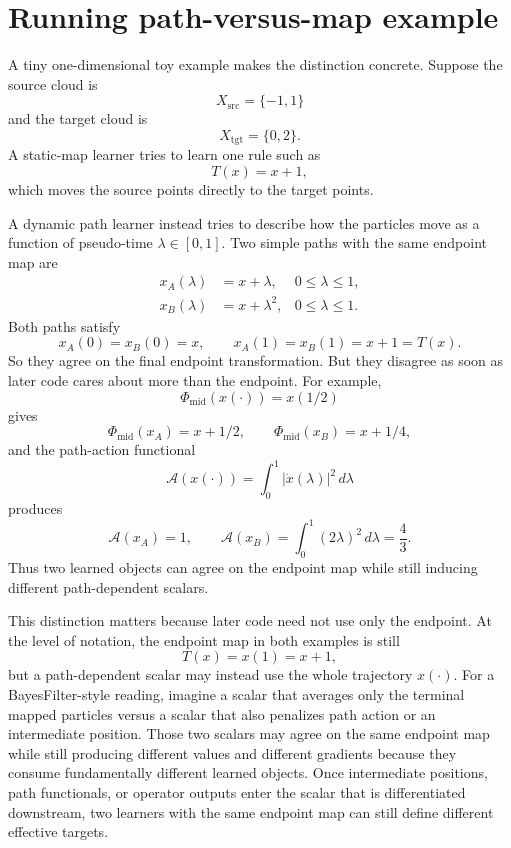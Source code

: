 \section{Running path-versus-map example}
\label{sec:bf-neural-ot-dynamic-toy-contrast}

A tiny one-dimensional toy example makes the distinction concrete.  Suppose the
source cloud is
\[
  X_{\mathrm{src}}=\{-1,1\}
\]
and the target cloud is
\[
  X_{\mathrm{tgt}}=\{0,2\}.
\]
A static-map learner tries to learn one rule such as
\begin{equation}
\label{eq:bf-neural-ot-dynamic-static-map}
  T(x)=x+1,
\end{equation}
which moves the source points directly to the target points.

A dynamic path learner instead tries to describe how the particles move as a
function of pseudo-time \(\lambda\in[0,1]\).  Two simple paths with the same
endpoint map are
\begin{align}
\label{eq:bf-neural-ot-dynamic-path-example}
  x_A(\lambda)&=x+\lambda,
  &0\le \lambda\le 1,\\
  x_B(\lambda)&=x+\lambda^2,
  &0\le \lambda\le 1.
\end{align}
Both paths satisfy
\[
  x_A(0)=x_B(0)=x,
  \qquad
  x_A(1)=x_B(1)=x+1=T(x).
\]
So they agree on the final endpoint transformation.  But they disagree as soon as
later code cares about more than the endpoint.  For example,
\begin{equation}
\label{eq:bf-neural-ot-dynamic-midpoint-functional}
  \Phi_{\mathrm{mid}}(x(\cdot))=x(1/2)
\end{equation}
gives
\[
  \Phi_{\mathrm{mid}}(x_A)=x+1/2,
  \qquad
  \Phi_{\mathrm{mid}}(x_B)=x+1/4,
\]
and the path-action functional
\begin{equation}
\label{eq:bf-neural-ot-dynamic-action-functional}
  \mathcal A(x(\cdot))
  =
  \int_0^1 |\dot x(\lambda)|^2\,d\lambda
\end{equation}
produces
\[
  \mathcal A(x_A)=1,
  \qquad
  \mathcal A(x_B)=\int_0^1 (2\lambda)^2\,d\lambda = \frac{4}{3}.
\]
Thus two learned objects can agree on the endpoint map while still inducing
different path-dependent scalars.

This distinction matters because later code need not use only the endpoint.
At the level of notation, the endpoint map in both examples is still
\begin{equation}
\label{eq:bf-neural-ot-dynamic-endpoint-map-summary}
  T(x)=x(1)=x+1,
\end{equation}
but a path-dependent scalar may instead use the whole trajectory
\(x(\cdot)\).  For a BayesFilter-style reading, imagine a scalar that averages only
the terminal mapped particles versus a scalar that also penalizes path action or an
intermediate position.  Those two scalars may agree on the same endpoint map while
still producing different values and different gradients because they consume
fundamentally different learned objects.  Once intermediate positions, path
functionals, or operator outputs enter the scalar that is differentiated
downstream, two learners with the same endpoint map can still define different
effective targets.

